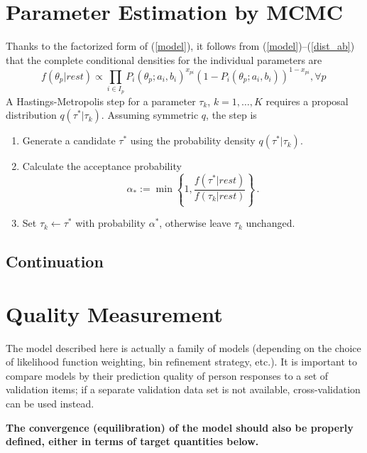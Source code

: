 \documentclass{article}
\newcommand{\ta}{\theta}
\begin{document}
\section{Parameter Estimation by MCMC}
Thanks to the factorized form of (\ref{model}), it follows from (\ref{model})--(\ref{dist_ab}) that the complete conditional densities for the individual parameters are
\begin{equation}
  f(\ta_p|rest) \propto \prod_{i \in I_p} 
  P_i(\ta_p;a_i,b_i)^{x_{pi}} 
  \left(1 - P_i(\ta_p;a_i,b_i)\right)^{1-x_{pi}},\forall p\,
  \label{cond_ta}
\end{equation}
A Hastings-Metropolis step for a parameter $\tau_k$, $k=1,\dots,K$ requires a proposal distribution $q(\tau^*|\tau_k)$. Assuming symmetric $q$, the step is
\begin{enumerate}
	\item Generate a candidate $\tau^*$ using the probability density $q(\tau^*|\tau_k)$.
	\item Calculate the acceptance probability
	\begin{equation}
		\alpha_* := \min\left\{1, \frac{f(\tau^*|rest)}{f(\tau_k|rest)} \right\}\,.
	\end{equation}
	\item Set $\tau_k \leftarrow \tau^*$ with probability $\alpha^*$, otherwise leave $\tau_k$ unchanged.
\end{enumerate}

\subsection{Continuation}

\section{Quality Measurement}
The model described here is actually a family of models (depending on the choice of likelihood function weighting, bin refinement strategy, etc.). It is important to compare models by their prediction quality of
person responses to a set of validation items; if a separate validation data set is not available, cross-validation can be used instead.

{\bf The convergence (equilibration) of the model should also be properly defined, either in terms of target quantities below.}
\end{document}
